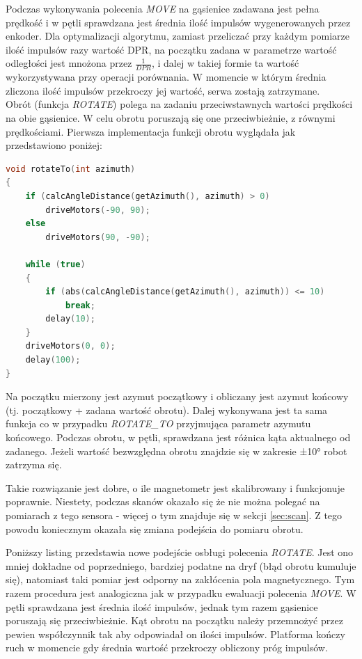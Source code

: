 Podczas wykonywania polecenia \emph{MOVE} na gąsienice zadawana jest pełna prędkość i w pętli sprawdzana jest średnia ilość impulsów wygenerowanych przez enkoder. Dla optymalizacji algorytmu, zamiast przeliczać przy każdym pomiarze ilość impulsów razy wartość DPR, na początku zadana w parametrze wartość odległości jest mnożona przez $\frac{1}{DPR}$, i dalej w takiej formie ta wartość wykorzystywana przy operacji porównania. W momencie w którym średnia zliczona ilość impulsów przekroczy jej wartość, serwa zostają zatrzymane.
\\ 

Obrót (funkcja \emph{ROTATE}) polega na zadaniu przeciwstawnych wartości prędkości na obie gąsienice. W celu obrotu poruszają się one przeciwbieżnie, z równymi prędkościami. Pierwsza implementacja funkcji obrotu wyglądała jak przedstawiono poniżej:

\begin{lstlisting}[basicstyle=\footnotesize\ttfamily,language=c++,caption=Funkcja będąca głównym elementem obsługi poleceń \emph{ROTATE} oraz \emph{ROTATE\_TO},label=lst:rotate-to-function]
void rotateTo(int azimuth)
{
    if (calcAngleDistance(getAzimuth(), azimuth) > 0)
        driveMotors(-90, 90);
    else
        driveMotors(90, -90);

    while (true)
    {
        if (abs(calcAngleDistance(getAzimuth(), azimuth)) <= 10)
            break;
        delay(10);
    }
    driveMotors(0, 0);
    delay(100);
}
\end{lstlisting}

Na początku mierzony jest azymut początkowy i obliczany jest azymut końcowy (tj. początkowy + zadana wartość obrotu). Dalej wykonywana jest ta sama funkcja co w przypadku \emph{ROTATE\_TO} przyjmująca parametr azymutu końcowego. Podczas obrotu, w pętli, sprawdzana jest różnica kąta aktualnego od zadanego. Jeżeli wartość bezwzględna obrotu znajdzie się w zakresie ±10° robot zatrzyma się.

Takie rozwiązanie jest dobre, o ile magnetometr jest skalibrowany i funkcjonuje poprawnie. Niestety, podczas skanów okazało się że nie można polegać na pomiarach z tego sensora - więcej o tym znajduje się w sekcji \ref{sec:scan}. Z tego powodu koniecznym okazała się zmiana podejścia do pomiaru obrotu.

Poniższy listing przedstawia nowe podejście osbługi polecenia \emph{ROTATE}. Jest ono mniej dokładne od poprzedniego, bardziej podatne na dryf (błąd obrotu kumuluje się), natomiast taki pomiar jest odporny na zakłócenia pola magnetycznego.
Tym razem procedura jest analogiczna jak w przypadku ewaluacji polecenia \emph{MOVE}. W pętli sprawdzana jest średnia ilość impulsów, jednak tym razem gąsienice poruszają się przeciwbieżnie. Kąt obrotu na początku należy przemnożyć przez pewien współczynnik tak aby odpowiadał on ilości impulsów. Platforma kończy ruch w momencie gdy średnia wartość przekroczy obliczony próg impulsów.


